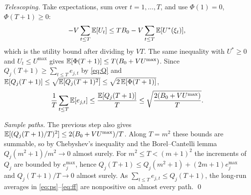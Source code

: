\emph{Telescoping.}
Take expectations, sum over $t=1,\dots,T$, and use $\Phi(1)=0$, $\Phi(T+1)\ge0$:
\[
-V\sum_{t\le T}\mathbb{E}[U_t]\le TB_0-V\sum_{t\le T}\mathbb{E}[U^*(\xi_t)],
\]
which is the utility bound after dividing by $VT$.
The same inequality with $U^*\ge0$ and $U_t\le U^{\max}$ gives $\mathbb{E}[\Phi(T+1)]\le T(B_0+VU^{\max})$.
Since $Q_j(T+1)\ge\sum_{t\le T}e_{j,t}$ by \eqref{eq:Q} and $\mathbb{E}[Q_j(T+1)]\le\sqrt{\mathbb{E}[Q_j(T+1)^2]}\le\sqrt{2\,\mathbb{E}[\Phi(T+1)]}$,
\[
\frac1T\sum_{t\le T}\mathbb{E}[e_{j,t}]\le\frac{\mathbb{E}[Q_j(T+1)]}{T}\le\sqrt{\frac{2(B_0+VU^{\max})}{T}} .
\]

\emph{Sample paths.}
The previous step also gives $\mathbb{E}[(Q_j(T+1)/T)^2]\le2(B_0+VU^{\max})/T$.
Along $T=m^2$ these bounds are summable, so by Chebyshev's inequality and the Borel--Cantelli lemma $Q_j(m^2+1)/m^2\to0$ almost surely.
For $m^2\le T<(m+1)^2$ the increments of $Q_j$ are bounded by $e_j^{\max}$, hence $Q_j(T+1)\le Q_j(m^2+1)+(2m+1)e_j^{\max}$ and $Q_j(T+1)/T\to0$ almost surely.
As $\sum_{t\le T}e_{j,t}\le Q_j(T+1)$, the long-run averages in \eqref{eq:ps}--\eqref{eq:ff} are nonpositive on almost every path. \qed
